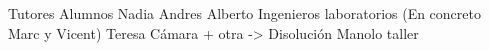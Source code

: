 Tutores
Alumnos Nadia
Andres
Alberto
Ingenieros laboratorios (En concreto Marc y Vicent)
Teresa Cámara + otra -> Disolución
Manolo taller

